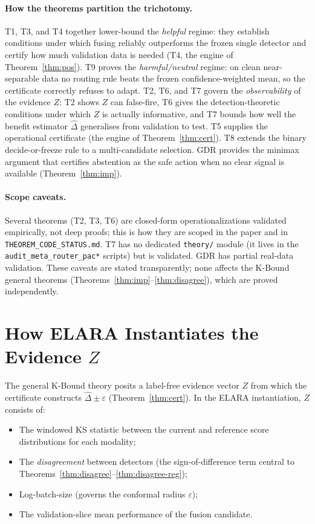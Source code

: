 \paragraph{How the theorems partition the trichotomy.}
T1, T3, and T4 together lower-bound the \emph{helpful} regime: they establish
conditions under which fusing reliably outperforms the frozen single detector and
certify how much validation data is needed (T4, the engine of
Theorem~\ref{thm:pos}).  T9 proves the \emph{harmful/neutral} regime: on clean
near-separable data no routing rule beats the frozen confidence-weighted mean, so
the certificate correctly refuses to adapt.  T2, T6, and T7 govern the
\emph{observability} of the evidence $Z$: T2 shows $Z$ can false-fire, T6 gives
the detection-theoretic conditions under which $Z$ is actually informative, and T7
bounds how well the benefit estimator $\widehat{\Delta}$ generalises from
validation to test.  T5 supplies the operational certificate (the engine of
Theorem~\ref{thm:cert}).  T8 extends the binary decide-or-freeze rule to a
multi-candidate selection.  GDR provides the minimax argument that certifies
abstention as the safe action when no clear signal is available (Theorem~\ref{thm:imp}).

\paragraph{Scope caveats.}
Several theorems (T2, T3, T6) are closed-form operationalizations validated
empirically, not deep proofs; this is how they are scoped in the paper and in
\texttt{THEOREM\_CODE\_STATUS.md}.  T7 has no dedicated \texttt{theory/} module
(it lives in the \texttt{audit\_meta\_router\_pac*} scripts) but is validated.
GDR has partial real-data validation.  These caveats are stated transparently;
none affects the K-Bound general theorems (Theorems~\ref{thm:imp}--\ref{thm:disagree}),
which are proved independently.

\section{How ELARA Instantiates the Evidence $Z$}\label{sec:elara-z}

The general K-Bound theory posits a label-free evidence vector $Z$ from which
the certificate constructs $\widehat{\Delta} \pm \varepsilon$ (Theorem~\ref{thm:cert}).
In the ELARA instantiation, $Z$ consists of:
\begin{itemize}
\item The windowed KS statistic between the current and reference score distributions
  for each modality;
\item The \emph{disagreement} between detectors (the sign-of-difference term central
  to Theorems~\ref{thm:disagree}--\ref{thm:disagree-reg});
\item Log-batch-size (governs the conformal radius $\varepsilon$);
\item The validation-slice mean performance of the fusion candidate.
\end{itemize}

